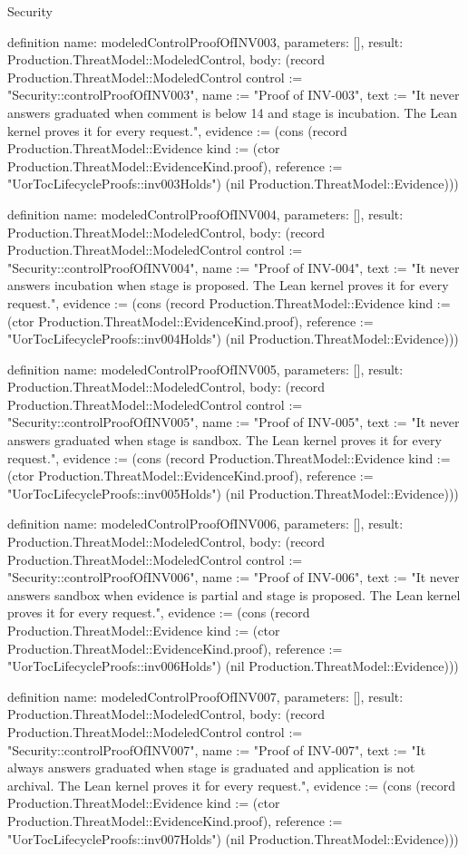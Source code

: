 \begin{lexlean}{Security}
\begin{semanticmodule}
definition{
  name: modeledControlProofOfINV003,
  parameters: [],
  result: Production.ThreatModel::ModeledControl,
  body: (record Production.ThreatModel::ModeledControl {control := "Security::controlProofOfINV003", name := "Proof of INV-003", text := "It never answers graduated when comment is below 14 and stage is incubation. The Lean kernel proves it for every request.", evidence := (cons (record Production.ThreatModel::Evidence {kind := (ctor Production.ThreatModel::EvidenceKind.proof), reference := "UorTocLifecycleProofs::inv003Holds"}) (nil Production.ThreatModel::Evidence))})
}

definition{
  name: modeledControlProofOfINV004,
  parameters: [],
  result: Production.ThreatModel::ModeledControl,
  body: (record Production.ThreatModel::ModeledControl {control := "Security::controlProofOfINV004", name := "Proof of INV-004", text := "It never answers incubation when stage is proposed. The Lean kernel proves it for every request.", evidence := (cons (record Production.ThreatModel::Evidence {kind := (ctor Production.ThreatModel::EvidenceKind.proof), reference := "UorTocLifecycleProofs::inv004Holds"}) (nil Production.ThreatModel::Evidence))})
}

definition{
  name: modeledControlProofOfINV005,
  parameters: [],
  result: Production.ThreatModel::ModeledControl,
  body: (record Production.ThreatModel::ModeledControl {control := "Security::controlProofOfINV005", name := "Proof of INV-005", text := "It never answers graduated when stage is sandbox. The Lean kernel proves it for every request.", evidence := (cons (record Production.ThreatModel::Evidence {kind := (ctor Production.ThreatModel::EvidenceKind.proof), reference := "UorTocLifecycleProofs::inv005Holds"}) (nil Production.ThreatModel::Evidence))})
}

definition{
  name: modeledControlProofOfINV006,
  parameters: [],
  result: Production.ThreatModel::ModeledControl,
  body: (record Production.ThreatModel::ModeledControl {control := "Security::controlProofOfINV006", name := "Proof of INV-006", text := "It never answers sandbox when evidence is partial and stage is proposed. The Lean kernel proves it for every request.", evidence := (cons (record Production.ThreatModel::Evidence {kind := (ctor Production.ThreatModel::EvidenceKind.proof), reference := "UorTocLifecycleProofs::inv006Holds"}) (nil Production.ThreatModel::Evidence))})
}

definition{
  name: modeledControlProofOfINV007,
  parameters: [],
  result: Production.ThreatModel::ModeledControl,
  body: (record Production.ThreatModel::ModeledControl {control := "Security::controlProofOfINV007", name := "Proof of INV-007", text := "It always answers graduated when stage is graduated and application is not archival. The Lean kernel proves it for every request.", evidence := (cons (record Production.ThreatModel::Evidence {kind := (ctor Production.ThreatModel::EvidenceKind.proof), reference := "UorTocLifecycleProofs::inv007Holds"}) (nil Production.ThreatModel::Evidence))})
}


\end{semanticmodule}
\end{lexlean}
